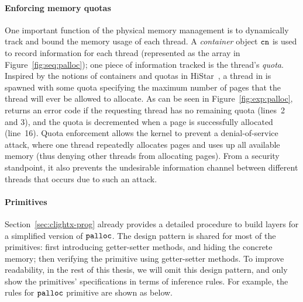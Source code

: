 \paragraph{Enforcing memory quotas}
One important function of the physical memory management is to dynamically
track and bound the memory usage of each thread. A \emph{container}
object ${\texttt{cn}}$ is used to record information for each thread (represented as the array 
in Figure~\ref{fig:seq:palloc}); one piece of information tracked is the
thread's \emph{quota}. Inspired by the notions of containers and
quotas in HiStar~\cite{zeldovich06}, a thread
in {\mCTOS} is spawned with some quota specifying the maximum number
of pages that the thread will ever be allowed to allocate. As can be
seen in Figure~\ref{fig:exp:palloc},  returns an error
code if the requesting thread has no remaining quota (lines~2 and 3), 
and the quota is decremented when a page is successfully allocated (line~16).
Quota enforcement allows the kernel to prevent a denial-of-service attack,
where one thread repeatedly allocates pages and uses up all available
memory (thus denying other threads from allocating pages). From a security
standpoint, it also prevents the undesirable information channel between 
different threads that occurs due to such an attack.

\paragraph{Primitives}
Section~\ref{sec:clightx-prog}
already provides
a detailed procedure
to build layers for a simplified version of
${\texttt{palloc}}$.
The design pattern
is shared for most of the primitives:
first introducing getter-setter methods,
and hiding the concrete memory;
then verifying the primitive using
getter-setter methods.
To improve
readability,
in the rest of this thesis,
we will omit
this design pattern,
and only show the primitives' specifications
in terms of inference rules.
For example,
the rules for ${\texttt{palloc}}$ primitive are shown as below.


